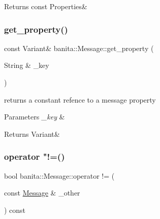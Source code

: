 \begin{DoxyReturn}{Returns}
const Properties\& 
\end{DoxyReturn}
\mbox{\label{classbanita_1_1_message_ac05afd843e1c6cee7965bdc90bcce84f}} 
\subsubsection{\texorpdfstring{get\_property()}{get\_property()}}
{\footnotesize\ttfamily const Variant\& banita\+::\+Message\+::get\+\_\+property (\begin{DoxyParamCaption}\item[{String \&}]{\+\_\+key }\end{DoxyParamCaption})\hspace{0.3cm}{\ttfamily [inline]}}



returns a constant refence to a message property 


\begin{DoxyParams}{Parameters}
{\em \+\_\+key} & \\
\hline
\end{DoxyParams}
\begin{DoxyReturn}{Returns}
Variant\& 
\end{DoxyReturn}
\mbox{\label{classbanita_1_1_message_a0eafd97ad4fbb72b96f464280c68bec5}} 
\subsubsection{\texorpdfstring{operator "!=()}{operator !=()}}
{\footnotesize\ttfamily bool banita\+::\+Message\+::operator != (\begin{DoxyParamCaption}\item[{const \mbox{\hyperlink{classbanita_1_1_message}{Message}} \&}]{\+\_\+other }\end{DoxyParamCaption}) const\hspace{0.3cm}{\ttfamily [inline]}}

\mbox{\label{classbanita_1_1_message_a0a586520c54ba6631e91f907ac6d0dc0}} 
